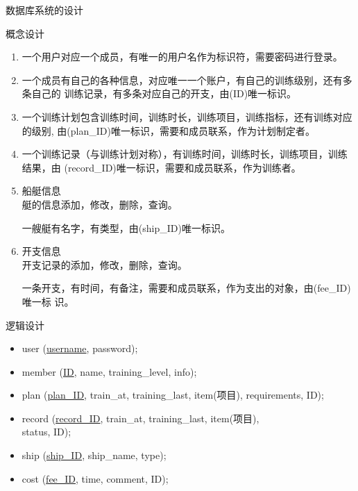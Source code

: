 \documentclass{beamer}
\begin{document}
\begin{frame}{数据库系统的设计}
   {
    概念设计

    \begin{enumerate}
    \item
      {
        一个用户对应一个成员，有唯一的用户名作为标识符，需要密码进行登录。
      }

    \item{
        一个成员有自己的各种信息，对应唯一一个账户，有自己的训练级别，还有多条自己的
        训练记录，有多条对应自己的开支，由(ID)唯一标识。
      }

    \item{
        一个训练计划包含训练时间，训练时长，训练项目，训练指标，还有训练对应的级别,
        由(plan\_ID)唯一标识，需要和成员联系，作为计划制定者。
      }

    \item {
        一个训练记录（与训练计划对称），有训练时间，训练时长，训练项目，训练结果，由
        (record\_ID)唯一标识，需要和成员联系，作为训练者。
      }
      
    \item {船艇信息\\
        艇的信息添加，修改，删除，查询。

        一艘艇有名字，有类型，由(ship\_ID)唯一标识。
      }

    \item {开支信息\\
        开支记录的添加，修改，删除，查询。

        一条开支，有时间，有备注，需要和成员联系，作为支出的对象，由(fee\_ID)唯一标
        识。
      }
    \end{enumerate}    
    
  }

   {
    逻辑设计

    \begin{itemize}
      \item user (\underline{username}, password);
      \item member (\underline{ID}, name, training\_level, info);
      \item plan (\underline{plan\_ID}, train\_at, training\_last, item(项目),
        requirements, ID);
      \item record (\underline{record\_ID}, train\_at, training\_last, item(项目),\\
        status, ID);
      \item ship (\underline{ship\_ID}, ship\_name, type);
      \item cost (\underline{fee\_ID}, time, comment, ID);
    \end{itemize}
    
}
\end{frame}
\end{document}
